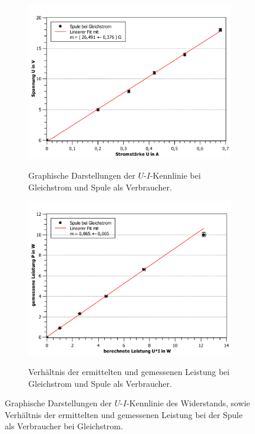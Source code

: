 \begin{figure}[ht]
	\label{fig:Spule_gleich}
	\centering	
	\begin{subfigure}{0.70\textwidth}
		\centering
		\includegraphics[width=\textwidth]{auswertung/spule-gleich-Widerstand.pdf}
		\label{fig:5}
		\caption{Graphische Darstellungen der $U$-$I$-Kennlinie bei Gleichstrom und Spule als Verbraucher.}	
	\end{subfigure}
	\begin{subfigure}{0.70\textwidth}
		\centering
		\includegraphics[width=\textwidth]{auswertung/spule-gleich-Leistung.pdf}
		\label{fig:6}
		\caption{Verhältnis der ermittelten und gemessenen Leistung bei Gleichstrom und Spule als Verbraucher.}	
	\end{subfigure}
	\caption{Graphische Darstellungen der $U$-$I$-Kennlinie des Widerstands, sowie Verhältnis der ermittelten und gemessenen Leistung bei der Spule als Verbraucher bei Gleichstrom.}
\end{figure}
